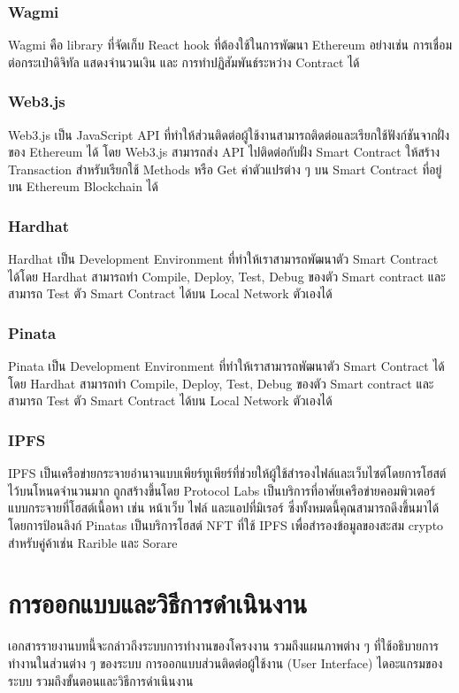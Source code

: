 \documentclass[12pt,oneside,openright,a4paper]{cpe-thai-project}
\begin{document}
\subsection{Wagmi \cite{wagmi}}
\tab Wagmi คือ library ที่จัดเก็บ React hook ที่ต้องใช้ในการพัฒนา Ethereum อย่างเช่น การเชื่อมต่อกระเป๋าดิจิทัล แสดงจำนวนเงิน และ การทำปฏิสัมพันธ์ระหว่าง Contract ได้

\subsection{Web3.js \cite{web3js}}
\tab Web3.js เป็น JavaScript API ที่ทําให้ส่วนติดต่อผู้ใช้งานสามารถติดต่อและเรียกใช้ฟังก์ชันจากฝั่งของ Ethereum ได้ โดย Web3.js สามารถส่ง API ไปติดต่อกับฝั่ง Smart Contract ให้สร้าง Transaction สําหรับเรียกใช้ Methods หรือ Get ค่าตัวแปรต่าง ๆ บน Smart Contract ที่อยู่บน Ethereum Blockchain ได้

\subsection{Hardhat \cite{hardhat}}
\tab Hardhat เป็น Development Environment ที่ทำให้เราสามารถพัฒนาตัว Smart Contract ได้โดย Hardhat สามารถทำ Compile, Deploy, Test, Debug ของตัว Smart contract และ สามารถ Test ตัว Smart Contract ได้บน Local Network ตัวเองได้

\subsection{Pinata \cite{pinata}}
\tab Pinata เป็น Development Environment ที่ทำให้เราสามารถพัฒนาตัว Smart Contract ได้โดย Hardhat สามารถทำ Compile, Deploy, Test, Debug ของตัว Smart contract และ สามารถ Test ตัว Smart Contract ได้บน Local Network ตัวเองได้

\subsection{IPFS \cite{ipfs}}
\tab IPFS เป็นเครือข่ายกระจายอำนาจแบบเพียร์ทูเพียร์ที่ช่วยให้ผู้ใช้สำรองไฟล์และเว็บไซต์โดยการโฮสต์ไว้บนโหนดจำนวนมาก ถูกสร้างขึ้นโดย Protocol Labs เป็นบริการที่อาศัยเครือข่ายคอมพิวเตอร์แบบกระจายที่โฮสต์เนื้อหา เช่น หน้าเว็บ ไฟล์ และแอปที่มิเรอร์ ซึ่งทั้งหมดนี้คุณสามารถดึงขึ้นมาได้โดยการป้อนลิงก์
Pinatas เป็นบริการโฮสต์ NFT ที่ใช้ IPFS เพื่อสำรองข้อมูลของสะสม crypto สำหรับคู่ค้าเช่น Rarible และ Sorare


\chapter{การออกแบบและวิธีการดำเนินงาน}
\tab เอกสารรายงานบทนี้จะกล่าวถึงระบบการทำงานของโครงงาน รวมถึงแผนภาพต่าง ๆ ที่ใช้อธิบายการทำงานในส่วนต่าง ๆ ของระบบ การออกแบบส่วนติดต่อผู้ใช้งาน (User Interface) ไดอะแกรมของระบบ รวมถึงขั้นตอนและวิธีการดำเนินงาน
\end{document}
